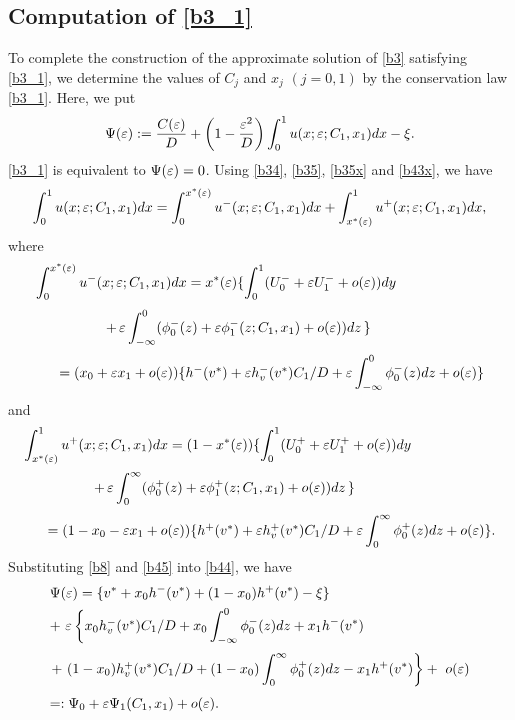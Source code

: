 \documentclass[a4,10pt]{article}
\begin{document}
\subsection{Computation of \eqref{b3_1}}\label{S2.3} %

To complete the construction of the approximate solution of \eqref{b3} satisfying \eqref{b3_1}, 
we determine the values of $C_j$ and $x_j$ $(j=0,1)$ by the conservation law \eqref{b3_1}. 
Here, we put 
%
\begin{equation}\label{b44}
\Psi(\varepsilon) := \displaystyle\frac{C(\varepsilon)}{D} + \left( 1 - \frac{\varepsilon^2}{D} \right) \int_0^1 u(x;\varepsilon;C_1,x_1)dx - \xi. 
\end{equation}
%
\eqref{b3_1} is equivalent to $\Psi(\varepsilon) = 0$. 
Using \eqref{b34}, \eqref{b35}, \eqref{b35x} and \eqref{b43x}, we 
have
%
\begin{equation}\label{b45}
\int_0^1 u(x;\varepsilon;C_1,x_1)dx  = \int_0^{x^*(\varepsilon)} u^-(x;\varepsilon;C_1,x_1)dx  
+ \int_{x^*(\varepsilon)}^1 u^+(x;\varepsilon;C_1,x_1)dx,
\end{equation}
%
where
\[
\begin{array}{l}
\dis\int_0^{x^*(\ep)} u^-(x;\ep;C_1,x_1)dx  = x^*(\ep) \{
\dis\int_0^1 ( U^-_0 +\ep  U^-_1 + o(\ep) ) dy 
\\[3ex]
\ \ \ \ \ \ \ \ \ \ \ \ \ \ \ 
+ \, \ep \dis\int_{-\infty}^0  ( {\phi}_0^-(z) +  \ep {\phi}_1^-(z;C_1,x_1) + o(\ep) )dz
\, \} 
\\[3ex]
\ \ \ \ \ 
= ( x_0 + \ep x_1 + o(\ep) )\{ h^-(v^*) + \ep h_v^-(v^*)C_1/D 
+ \ep \dis\int_{-\infty}^0   {\phi}_0^-(z) dz + o(\ep) \}
\end{array}
\]
%
and
%
\[
\begin{array}{l}
\dis\int_{x^*(\ep)}^1 u^+(x;\ep;C_1,x_1)dx  = (1-x^*(\ep)) \{
\dis\int_0^1 ( U^+_0 +\ep  U^+_1 + o(\ep) ) dy 
\\[3ex]
\ \ \ \ \ \ \ \ \ \ \ \ \ \ \ 
+ \, \ep \dis\int^{\infty}_0  ( {\phi}_0^+(z) +  \ep {\phi}_1^+(z;C_1,x_1) + o(\ep))dz
\, \} 
\\[3ex]
\ \ \ \ \ 
= (1- x_0 - \ep x_1 + o(\ep) )\{ h^+(v^*) + \ep h_v^+(v^*)C_1/D 
+  \ep \dis\int^{\infty}_0   {\phi}_0^+(z) dz + o(\ep) \}.
\end{array}
\]
%
Substituting \eqref{b8} and \eqref{b45} into \eqref{b44}, we have  
\begin{equation}\label{b45_1}
\begin{array}{l}
\Psi(\varepsilon) = \displaystyle \{v^* + x_0 h^-(v^*) + (1- x_0) h^+(v^*) - \xi \} \\[1ex]
+ \ \varepsilon \left\{ x_0 h_v^-(v^*)C_1/D + 
x_0 \displaystyle\int_{-\infty}^0   {\phi}_0^-(z) dz + x_1 h^-(v^*)\right. \\[3ex]
\left. + \ (1-x_0) h_v^+(v^*)C_1/D 
+ (1-x_0) \displaystyle\int^{\infty}_0   {\phi}_0^+(z) dz   - x_1 h^+(v^*) \right\} 
+ \ o(\varepsilon) \\[3ex]
 =: \Psi_0 + \varepsilon \Psi_1(C_1,x_1) + o(\varepsilon). 
\end{array}
\end{equation}
\end{document}
